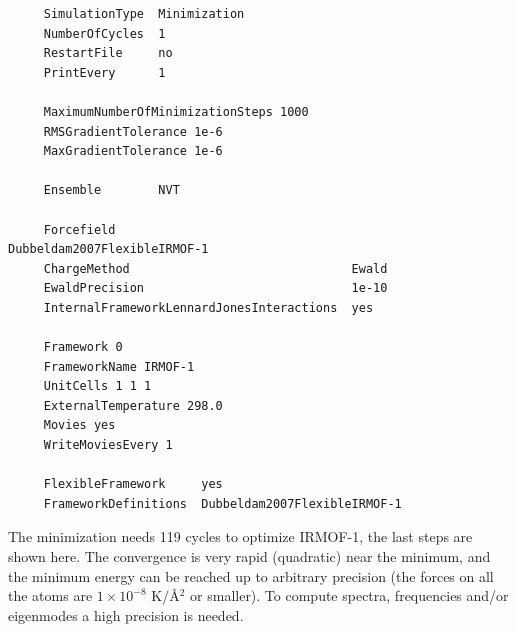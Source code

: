 \begin{tiny}
\begin{verbatim}
     SimulationType  Minimization
     NumberOfCycles  1
     RestartFile     no
     PrintEvery      1
     
     MaximumNumberOfMinimizationSteps 1000
     RMSGradientTolerance 1e-6
     MaxGradientTolerance 1e-6
     
     Ensemble        NVT
     
     Forcefield                                 Dubbeldam2007FlexibleIRMOF-1
     ChargeMethod                               Ewald
     EwaldPrecision                             1e-10
     InternalFrameworkLennardJonesInteractions  yes
     
     Framework 0
     FrameworkName IRMOF-1
     UnitCells 1 1 1
     ExternalTemperature 298.0
     Movies yes
     WriteMoviesEvery 1
     
     FlexibleFramework     yes
     FrameworkDefinitions  Dubbeldam2007FlexibleIRMOF-1
\end{verbatim}
\end{tiny}
The minimization needs 119 cycles to optimize IRMOF-1, the last steps are shown here. The convergence is very rapid (quadratic) near the minimum,
and the minimum energy can be reached up to arbitrary precision (the forces on all the atoms are $1\times10^{-8}$ K/\AA$^2$
or smaller). To compute spectra, frequencies and/or eigenmodes a high precision is needed.
